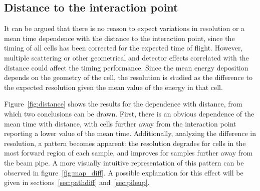 \subsection{Distance to the interaction point}
\label{subsec:distance}
It can be argued that there is no reason to expect variations in resolution or a mean time dependence with the distance to the interaction point, since the timing of all cells has been corrected for the expected time of flight.
However, multiple scattering or other geometrical and detector effects correlated with the distance could affect the timing performance.
Since the mean energy deposition depends on the geometry of the cell, 
the resolution is studied as the difference to the expected resolution given the mean value of the energy in that cell.

Figure~\ref{fig:distance} shows the results for the dependence with
distance, from which two conclusions can be drawn.
First, there is an obvious
dependence of the mean time with distance, with cells further away
from the interaction point reporting a lower value of the mean time.
Additionally, analyzing the difference in resolution, a pattern 
becomes apparent:
the resolution degrades for cells in the most forward region
of each sample, and improves for samples further away from the
beam pipe.
A more visually intuitive representation of this pattern
can be observed in figure~\ref{fig:map_diff}.
A possible explanation
for this effect will be given in sections~\ref{sec:pathdiff}
and~\ref{sec:pileup}.
